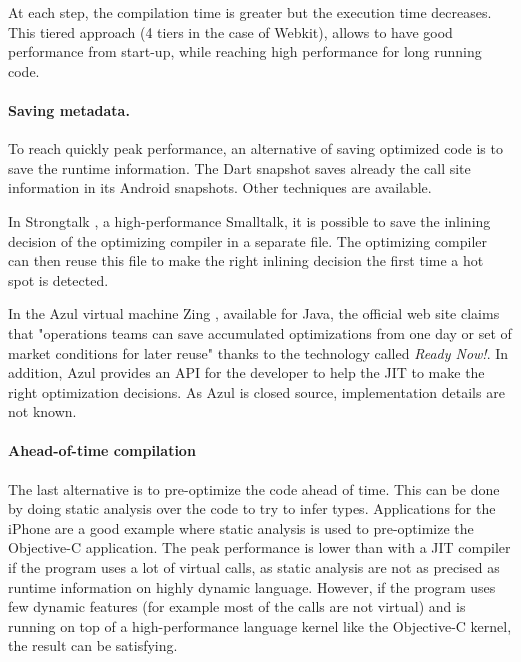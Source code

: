 \documentclass[a4paper,12pt,twoside]{../includes/ThesisStyle}
\begin{document}
At each step, the compilation time is greater but the execution time decreases. This tiered approach (4 tiers in the case of Webkit), allows to have good performance from start-up, while reaching high performance for long running code.

\paragraph{Saving metadata.}

To reach quickly peak performance, an alternative of saving optimized code is to save the runtime information. The Dart snapshot saves already the call site information in its Android snapshots. Other techniques are available.

In Strongtalk \cite{Sun06}, a high-performance Smalltalk, it is possible to save the inlining decision of the optimizing compiler in a separate file. The optimizing compiler can then reuse this file to make the right inlining decision the first time a hot spot is detected.

In the Azul virtual machine Zing \cite{Azul}, available for Java, the official web site claims that "operations teams can save accumulated optimizations from one day or set of market conditions for later reuse" thanks to the technology called \emph{Ready Now!}. In addition, Azul provides an API for the developer to help the JIT to make the right optimization decisions. As Azul is closed source, implementation details are not known. 

\paragraph{Ahead-of-time compilation}

The last alternative is to pre-optimize the code ahead of time. This can be done by doing static analysis over the code to try to infer types. Applications for the iPhone are a good example where static analysis is used to pre-optimize the Objective-C application. The peak performance is lower than with a JIT compiler if the program uses a lot of virtual calls, as static analysis are not as precised as runtime information on highly dynamic language. 
However, if the program uses few dynamic features (for example most of the calls are not virtual) and is running on top of a high-performance language kernel like the Objective-C kernel, the result can be satisfying.
\end{document}
